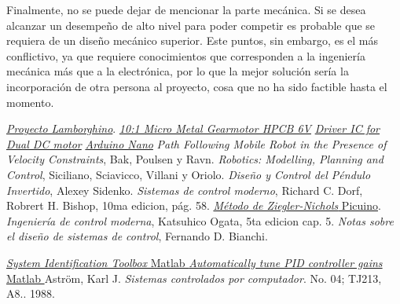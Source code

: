\documentclass[10pt,conference,a4paper,onecolumn]{article}%
\begin{document}
Finalmente, no se puede dejar de mencionar la parte mecánica. Si se desea alcanzar un desempeño de alto nivel para poder competir es probable que se requiera de un diseño mecánico superior. Este puntos, sin embargo, es el más conflictivo, ya que requiere conocimientos que corresponden a la ingeniería mecánica más que a la electrónica, por lo que la mejor solución sería la incorporación de otra persona al proyecto, cosa que no ha sido factible hasta el momento.
\begin{thebibliography}{X}
%
 \href{http://lamborghino.com}{\textit{Proyecto Lamborghino}}. 
\href{https://www.pololu.com/product/3061}{\textit{10:1 Micro Metal Gearmotor HPCB 6V}}
\href{ https://www.pololu.com/file/0J86/TB6612FNG.pdf}{\textit{Driver IC for Dual DC motor}}
 \href{https://store.arduino.cc/usa/arduino-nano}{\textit{Arduino Nano}}
 \textit{Path Following Mobile Robot in the Presence of Velocity Constraints}, Bak, Poulsen y Ravn.
 \textit{Robotics: Modelling, Planning and Control}, Siciliano, Sciavicco, Villani y Oriolo.
 \textit{Diseño y Control del Péndulo Invertido}, Alexey Sidenko.
 \textit{Sistemas de control moderno}, Richard C. Dorf, Robrert H. Bishop, 10ma edicion, pág. 58.
 \href{https://sites.google.com/site/picuino/ziegler-nichols}{\textit{ Método de Ziegler-Nichols}  Picuino}.
 \textit{Ingeniería de control moderna}, Katsuhico Ogata, 5ta edicion cap. 5.
 \textit{Notas sobre el diseño de sistemas de control}, Fernando D. Bianchi.

\href{https://la.mathworks.com/products/sysid.html}{\textit{System Identification Toolbox} Matlab \textregistered}
\href{https://la.mathworks.com/discovery/pid-tuning.html}{\textit{Automatically tune PID controller gains} Matlab \textregistered}
 Aström, Karl J. \textit{Sistemas controlados por computador}. No. 04; TJ213, A8.. 1988.
\end{thebibliography}
\end{document}
